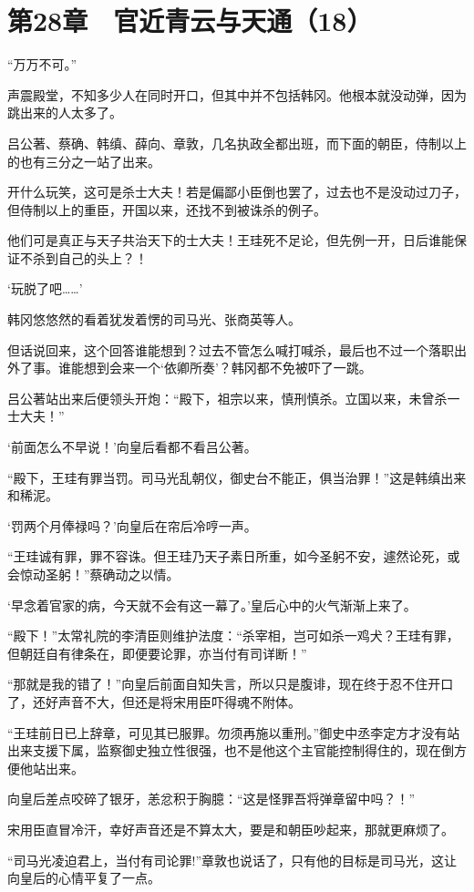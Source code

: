 \section{第28章　官近青云与天通（18）}

“万万不可。”

声震殿堂，不知多少人在同时开口，但其中并不包括韩冈。他根本就没动弹，因为跳出来的人太多了。

吕公著、蔡确、韩缜、薛向、章敦，几名执政全都出班，而下面的朝臣，侍制以上的也有三分之一站了出来。

开什么玩笑，这可是杀士大夫！若是偏鄙小臣倒也罢了，过去也不是没动过刀子，但侍制以上的重臣，开国以来，还找不到被诛杀的例子。

他们可是真正与天子共治天下的士大夫！王珪死不足论，但先例一开，日后谁能保证不杀到自己的头上？！

‘玩脱了吧……’

韩冈悠悠然的看着犹发着愣的司马光、张商英等人。

但话说回来，这个回答谁能想到？过去不管怎么喊打喊杀，最后也不过一个落职出外了事。谁能想到会来一个‘依卿所奏’？韩冈都不免被吓了一跳。

吕公著站出来后便领头开炮：“殿下，祖宗以来，慎刑慎杀。立国以来，未曾杀一士大夫！”

‘前面怎么不早说！’向皇后看都不看吕公著。

“殿下，王珪有罪当罚。司马光乱朝仪，御史台不能正，俱当治罪！”这是韩缜出来和稀泥。

‘罚两个月俸禄吗？’向皇后在帘后冷哼一声。

“王珪诚有罪，罪不容诛。但王珪乃天子素日所重，如今圣躬不安，遽然论死，或会惊动圣躬！”蔡确动之以情。

‘早念着官家的病，今天就不会有这一幕了。’皇后心中的火气渐渐上来了。

“殿下！”太常礼院的李清臣则维护法度：“杀宰相，岂可如杀一鸡犬？王珪有罪，但朝廷自有律条在，即便要论罪，亦当付有司详断！”

“那就是我的错了！”向皇后前面自知失言，所以只是腹诽，现在终于忍不住开口了，还好声音不大，但还是将宋用臣吓得魂不附体。

“王珪前日已上辞章，可见其已服罪。勿须再施以重刑。”御史中丞李定方才没有站出来支援下属，监察御史独立性很强，也不是他这个主官能控制得住的，现在倒方便他站出来。

向皇后差点咬碎了银牙，恙忿积于胸臆：“这是怪罪吾将弹章留中吗？！”

宋用臣直冒冷汗，幸好声音还是不算太大，要是和朝臣吵起来，那就更麻烦了。

“司马光凌迫君上，当付有司论罪!”章敦也说话了，只有他的目标是司马光，这让向皇后的心情平复了一点。

